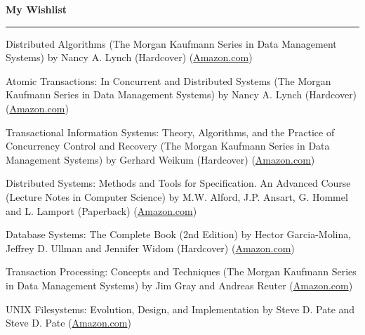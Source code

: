 \documentclass[10pt]{article}
\newcommand{\makeheading}[1]%
        {\hspace*{-\marginparsep minus \marginparwidth}%
         \begin{minipage}[t]{\textwidth+\marginparwidth+\marginparsep}%
                {\large \bfseries #1}\\[-0.15\baselineskip]%
                 \rule{\columnwidth}{1pt}%
         \end{minipage}}
\renewcommand{\section}[2]%
        {\pagebreak[2]\vspace{1.3\baselineskip}%
         \phantomsection\addcontentsline{toc}{section}{#1}%
         \hspace{0in}%
         \marginpar{
         \raggedright \scshape #1}#2}
\newenvironment{innerlist}[1][\enskip\textbullet]%
      {\begin{flushleft}\begin{compactitem}[#1]}{\end{compactitem}\end{flushleft}}
\begin{document}
\makeheading {My Wishlist}

\section {Books}
	\begin{innerlist}
                \item Distributed Algorithms (The Morgan Kaufmann Series in Data Management Systems)
                  by Nancy A. Lynch (Hardcover)
                  (\href{http://www.amazon.com/Distributed-Algorithms-Kaufmann-Management-Systems/dp/1558603484}{Amazon.com})
                \item Atomic Transactions: In Concurrent and Distributed Systems (The Morgan Kaufmann Series in Data Management Systems)
                  by Nancy A. Lynch (Hardcover)
                  (\href{http://www.amazon.com/Atomic-Transactions-Concurrent-Distributed-Management/dp/155860104X}{Amazon.com})
                \item Transactional Information Systems: Theory, Algorithms, and the Practice of Concurrency Control and Recovery (The Morgan Kaufmann Series in Data Management Systems)
                  by Gerhard Weikum (Hardcover)
                  (\href{http://www.amazon.com/Transactional-Information-Systems-Algorithms-Concurrency/dp/1558605088}{Amazon.com})
                \item Distributed Systems: Methods and Tools for Specification. An Advanced Course (Lecture Notes in Computer Science)
                  by M.W. Alford, J.P. Ansart, G. Hommel and L. Lamport  (Paperback)
                  (\href{http://www.amazon.com/Distributed-Systems-Specification-Advanced-Computer/dp/3540152164}{Amazon.com})
                \item Database Systems: The Complete Book (2nd Edition)
                  by Hector Garcia-Molina, Jeffrey D. Ullman and Jennifer Widom  (Hardcover)
                  (\href{http://www.amazon.com/Database-Systems-Complete-Book-2nd/dp/0131873253}{Amazon.com})
                \item Transaction Processing: Concepts and Techniques (The Morgan Kaufmann Series in Data Management Systems)
                  by Jim Gray and Andreas Reuter
                  (\href{http://www.amazon.com/Transaction-Processing-Concepts-Techniques-Management/dp/1558601902}{Amazon.com})
                \item UNIX Filesystems: Evolution, Design, and Implementation
                  by Steve D. Pate and Steve D. Pate
                  (\href{http://www.amazon.com/UNIX-Filesystems-Evolution-Design-Implementation/dp/0471164836}{Amazon.com})

\end{innerlist}
\end{document}
